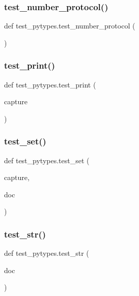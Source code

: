 \subsubsection{\texorpdfstring{test\_number\_protocol()}{test\_number\_protocol()}}
{\footnotesize\ttfamily def test\+\_\+pytypes.\+test\+\_\+number\+\_\+protocol (\begin{DoxyParamCaption}{ }\end{DoxyParamCaption})}

\mbox{\label{namespacetest__pytypes_a33f1f3b053db11d14920b4cc2104452e}} 
\subsubsection{\texorpdfstring{test\_print()}{test\_print()}}
{\footnotesize\ttfamily def test\+\_\+pytypes.\+test\+\_\+print (\begin{DoxyParamCaption}\item[{}]{capture }\end{DoxyParamCaption})}

\mbox{\label{namespacetest__pytypes_a275489a7e1230aea800129fc3ffdde15}} 
\subsubsection{\texorpdfstring{test\_set()}{test\_set()}}
{\footnotesize\ttfamily def test\+\_\+pytypes.\+test\+\_\+set (\begin{DoxyParamCaption}\item[{}]{capture,  }\item[{}]{doc }\end{DoxyParamCaption})}

\mbox{\label{namespacetest__pytypes_ad6d2ad05b3a87707742ead1e495ff1f3}} 
\subsubsection{\texorpdfstring{test\_str()}{test\_str()}}
{\footnotesize\ttfamily def test\+\_\+pytypes.\+test\+\_\+str (\begin{DoxyParamCaption}\item[{}]{doc }\end{DoxyParamCaption})}




